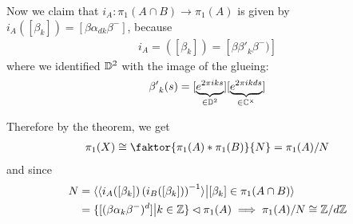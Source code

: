 \begin{ex}
  Now we claim that $i_A: \pi_1(A \cap B) \to \pi_1(A)$ is given by $i_A([\beta_k]) = [\beta \alpha_{dk}\beta^{-}]$, because
  \begin{align*}
    i_A = ([\beta_k]) = [\beta {\beta'}_k \beta^{-})]
  \end{align*}
  where we identified $\mathbb{D}^{2}$ with the image of the glueing:
  \begin{align*}
    {\beta'}_k(s) = [\underbrace{e^{2 \pi i k s}}_{\in \mathbb{D}^{2}}] [\underbrace{e^{2 \pi i k d s}}_{\in \mathbb{C}^{\times}}]
  \end{align*}

  Therefore by the theorem, we get
  \begin{align*}
    \pi_1(X) \iso \faktor{\pi_1(A) \ast \pi_1(B)}{N} = \pi_1(A)/N
  \end{align*}
  and since
  \begin{align*}
    N 
    &= 
    \langle\langle i_A([\beta_k]) \left(
          i_B([\beta_k])
    \right)^{-1}\rangle \big\vert [\beta_k] \in \pi_1(A \cap B) \rangle\\
    &=\{[(\beta \alpha_k \beta^{-})^{d}] \big\vert k \in \mathbb{Z}\} \lhd \pi_1(A) \implies \pi_1(A)/N \cong \mathbb{Z}/d\mathbb{Z}
  \end{align*}
\end{ex}


